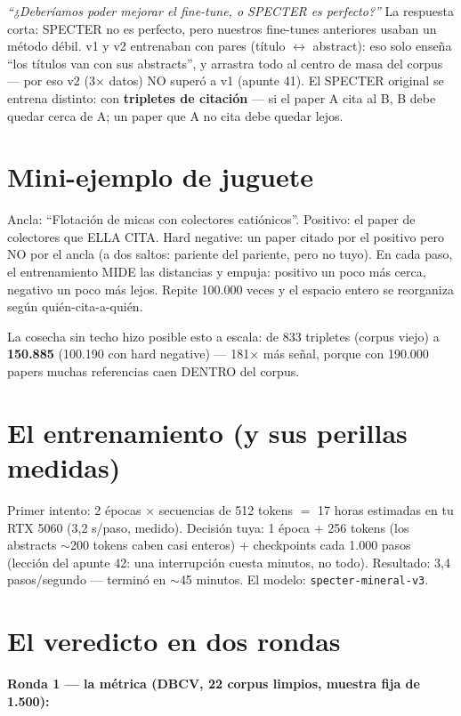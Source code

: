\documentclass[11pt,a4paper]{article}
\begin{document}
\emph{``¿Deberíamos poder mejorar el fine-tune, o SPECTER es perfecto?''} La respuesta
corta: SPECTER no es perfecto, pero nuestros fine-tunes anteriores usaban un método
débil. v1 y v2 entrenaban con pares (título $\leftrightarrow$ abstract): eso solo enseña
``los títulos van con sus abstracts'', y arrastra todo al centro de masa del corpus ---
por eso v2 (3$\times$ datos) NO superó a v1 (apunte 41). El SPECTER original se entrena
distinto: con \textbf{tripletes de citación} --- si el paper A cita al B, B debe quedar
cerca de A; un paper que A no cita debe quedar lejos.

\section{Mini-ejemplo de juguete}

Ancla: ``Flotación de micas con colectores catiónicos''. Positivo: el paper de colectores
que ELLA CITA. Hard negative: un paper citado por el positivo pero NO por el ancla (a dos
saltos: pariente del pariente, pero no tuyo). En cada paso, el entrenamiento MIDE las
distancias y empuja: positivo un poco más cerca, negativo un poco más lejos. Repite
100.000 veces y el espacio entero se reorganiza según quién-cita-a-quién.

La cosecha sin techo hizo posible esto a escala: de 833 tripletes (corpus viejo) a
\textbf{150.885} (100.190 con hard negative) --- 181$\times$ más señal, porque con
190.000 papers muchas referencias caen DENTRO del corpus.

\section{El entrenamiento (y sus perillas medidas)}

Primer intento: 2 épocas $\times$ secuencias de 512 tokens $=$ 17 horas estimadas en tu
RTX 5060 (3,2 s/paso, medido). Decisión tuya: 1 época + 256 tokens (los abstracts
$\sim$200 tokens caben casi enteros) + checkpoints cada 1.000 pasos (lección del apunte
42: una interrupción cuesta minutos, no todo). Resultado: 3,4 pasos/segundo --- terminó
en $\sim$45 minutos. El modelo: \texttt{specter-mineral-v3}.

\section{El veredicto en dos rondas}

\textbf{Ronda 1 --- la métrica (DBCV, 22 corpus limpios, muestra fija de 1.500):}
\end{document}

